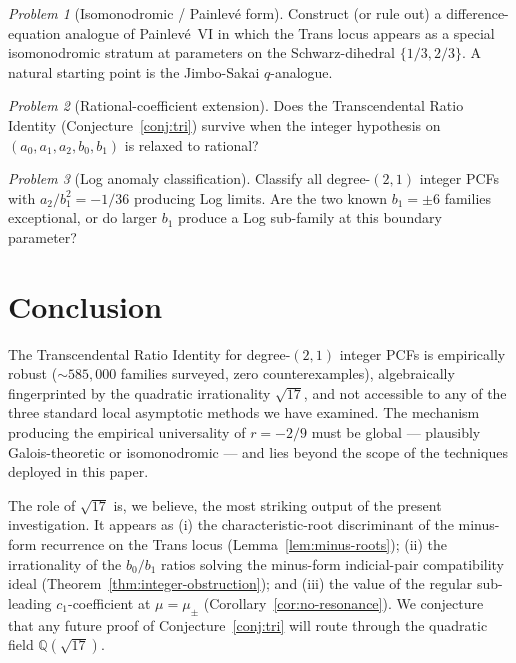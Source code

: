 \documentclass[11pt]{amsart}
\theoremstyle{definition}
\theoremstyle{remark}
\newtheorem{problem}{Problem}
\newcommand{\Q}{\mathbb{Q}}
\begin{document}
\begin{problem}[Isomonodromic / Painlevé form]\label{prob:painleve}
Construct (or rule out) a difference-equation analogue of
Painlevé~VI in which the Trans locus appears as a special
isomonodromic stratum at parameters on the Schwarz-dihedral
$\{1/3,2/3\}$.  A natural starting point is the Jimbo-Sakai
$q$-analogue.
\end{problem}

\begin{problem}[Rational-coefficient extension]
\label{prob:rational}
Does the Transcendental Ratio Identity (Conjecture~\ref{conj:tri})
survive when the integer hypothesis on $(a_0,a_1,a_2,b_0,b_1)$ is
relaxed to rational?
\end{problem}

\begin{problem}[Log anomaly classification]\label{prob:log-anomaly}
Classify all degree-$(2,1)$ integer PCFs with $a_2/b_1^2 = -1/36$
producing Log limits.  Are the two known $b_1=\pm 6$ families
exceptional, or do larger $b_1$ produce a Log sub-family at this
boundary parameter?
\end{problem}

\section{Conclusion}\label{sec:conclusion}

The Transcendental Ratio Identity for degree-$(2,1)$ integer PCFs is
empirically robust ($\sim\!585{,}000$ families surveyed, zero
counterexamples), algebraically fingerprinted by the quadratic
irrationality $\sqrt{17}$, and not accessible to any of the three
standard local asymptotic methods we have examined.  The mechanism
producing the empirical universality of $r=-2/9$ must be global ---
plausibly Galois-theoretic or isomonodromic --- and lies beyond the
scope of the techniques deployed in this paper.

The role of $\sqrt{17}$ is, we believe, the most striking output of
the present investigation.  It appears as (i) the characteristic-root
discriminant of the minus-form recurrence on the Trans locus
(Lemma~\ref{lem:minus-roots}); (ii) the irrationality of the
$b_0/b_1$ ratios solving the minus-form indicial-pair compatibility
ideal (Theorem~\ref{thm:integer-obstruction}); and (iii) the value
of the regular sub-leading $c_1$-coefficient at $\mu = \mu_\pm$
(Corollary~\ref{cor:no-resonance}).  We conjecture that any future
proof of Conjecture~\ref{conj:tri} will route through the quadratic
field $\Q(\sqrt{17})$.
\end{document}
